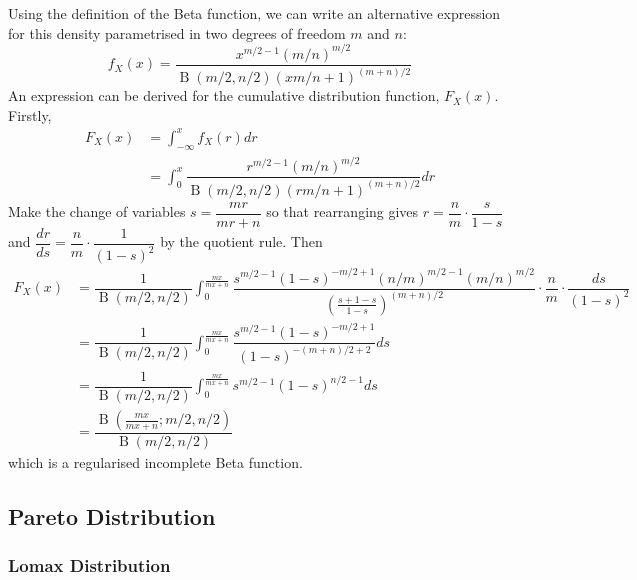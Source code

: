\documentclass[11pt]{report} %
\begin{document}
Using the definition of the Beta function, we can write an alternative expression for this density parametrised in two degrees of freedom $m$ and $n$:
\begin{equation}
f_{X}\left(x\right) = \dfrac{x^{m/2 - 1}\left(m/n\right)^{m/2}}{\operatorname{B}\left(m/2, n/2\right)\left(xm/n + 1\right)^{\left(m + n\right)/2}}
\end{equation}
An expression can be derived for the cumulative distribution function, $F_{X}\left(x\right)$. Firstly,
\begin{align}
F_{X}\left(x\right) &= \int_{-\infty}^{x}f_{X}\left(r\right)dr \\
&= \int_{0}^{x}\dfrac{r^{m/2 - 1}\left(m/n\right)^{m/2}}{\operatorname{B}\left(m/2, n/2\right)\left(rm/n + 1\right)^{\left(m + n\right)/2}}dr
\end{align}
Make the change of variables $s = \dfrac{mr}{mr + n}$ so that rearranging gives $r = \dfrac{n}{m}\cdot\dfrac{s}{1 - s}$ and $\dfrac{dr}{ds} = \dfrac{n}{m}\cdot\dfrac{1}{\left(1 - s\right)^{2}}$ by the quotient rule. Then
\begin{align}
F_{X}\left(x\right) &= \dfrac{1}{\operatorname{B}\left(m/2, n/2\right)}\int_{0}^{\frac{mx}{mx + n}}\dfrac{s^{m/2 - 1}\left(1 - s\right)^{-m/2 + 1}\left(n/m\right)^{m/2 - 1}\left(m/n\right)^{m/2}}{\left(\frac{s + 1 - s}{1 - s}\right)^{\left(m + n\right)/2}}\cdot\dfrac{n}{m}\cdot\dfrac{ds}{\left(1 - s\right)^{2}} \\
&= \dfrac{1}{\operatorname{B}\left(m/2, n/2\right)}\int_{0}^{\frac{mx}{mx + n}}\dfrac{s^{m/2 - 1}\left(1 - s\right)^{-m/2 + 1}}{\left(1 - s\right)^{-\left(m + n\right)/2 + 2}}ds \\
&= \dfrac{1}{\operatorname{B}\left(m/2, n/2\right)}\int_{0}^{\frac{mx}{mx + n}}s^{m/2 - 1}\left(1 - s\right)^{n/2 - 1}ds \\
&= \dfrac{\operatorname{B}\left(\frac{mx}{mx + n}; m/2, n/2\right)}{\operatorname{B}\left(m/2, n/2\right)}
\end{align}
which is a regularised incomplete Beta function.

\subsection{Pareto Distribution}

\subsubsection{Lomax Distribution}
\end{document}
